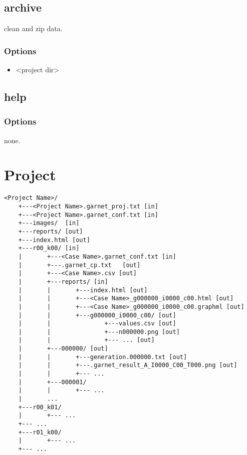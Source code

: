 \documentclass[]{article}
\begin{document}
\subsection{archive}\label{archive}

clean and zip data.

\subsubsection{Options}\label{options-7}

\begin{itemize}
\itemsep1pt\parskip0pt
\item
  \textless{}project dir\textgreater{}
\end{itemize}

\subsection{help}\label{help}

\subsubsection{Options}\label{options-8}

none.

\section{Project}\label{project}

\begin{verbatim}
<Project Name>/
    +---<Project Name>.garnet_proj.txt [in]
    +---<Project Name>.garnet_conf.txt [in]
    +---images/  [in]
    +---reports/ [out]
    +---index.html [out]
    +---r00_k00/ [in]
    |       +---<Case Name>.garnet_conf.txt [in]
    |       +---.garnet_cp.txt   [out]
    |       +---<Case Name>.csv [out]
    |       +---reports/ [in]
    |       |       +---index.html [out]
    |       |       +---<Case Name>_g000000_i0000_c00.html [out]
    |       |       +---<Case Name>_g000000_i0000_c00.graphml [out]
    |       |       +---g000000_i0000_c00/ [out]
    |       |               +---values.csv [out]
    |       |               +---n000000.png [out]
    |       |               +--- ... [out]
    |       +---000000/ [out]
    |       |       +---generation.000000.txt [out]
    |       |       +---.garnet_result_A_I0000_C00_T000.png [out]
    |       |       +--- ...
    |       +---000001/
    |       |       +--- ...
    |       ...
    +---r00_k01/
    |       +--- ...
    +--- ...
    +---r01_k00/
    |       +--- ...
    +--- ...
\end{verbatim}
\end{document}
